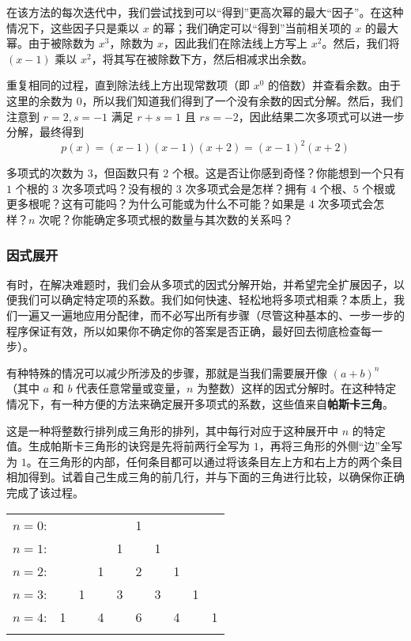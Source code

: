 在该方法的每次迭代中，我们尝试找到可以``得到''更高次幂的最大``因子''。在这种情况下，这些因子只是乘以 $x$ 的幂；我们确定可以``得到''当前相关项的 $x$ 的最大幂。由于被除数为 $x^3$，除数为 $x$，因此我们在除法线上方写上 $x^2$。然后，我们将 $(x-1)$ 乘以 $x^2$，将其写在被除数下方，然后相减求出余数。

重复相同的过程，直到除法线上方出现常数项（即 $x^0$ 的倍数）并查看余数。由于这里的余数为 $0$，所以我们知道我们得到了一个没有余数的因式分解。然后，我们注意到 $r=2, s=-1$ 满足 $r+s=1$ 且 $rs=-2$，因此结果二次多项式可以进一步分解，最终得到
\[p(x) = (x - 1)(x - 1)(x + 2) = (x - 1)^2(x + 2)\]

多项式的次数为 $3$，但函数只有 $2$ 个根。这是否让你感到奇怪？你能想到一个只有 $1$ 个根的 $3$ 次多项式吗？没有根的 $3$ 次多项式会是怎样？拥有 $4$ 个根、$5$ 个根或更多根呢？这有可能吗？为什么可能或为什么不可能？如果是 $4$ 次多项式会怎样？$n$ 次呢？你能确定多项式根的数量与其次数的关系吗？

\subsubsection*{因式展开}

有时，在解决难题时，我们会从多项式的因式分解开始，并希望完全扩展因子，以便我们可以确定特定项的系数。我们如何快速、轻松地将多项式相乘？本质上，我们一遍又一遍地应用分配律，而不必写出所有步骤（尽管这种基本的、一步一步的程序保证有效，所以如果你不确定你的答案是否正确，最好回去彻底检查每一步）。

有种特殊的情况可以减少所涉及的步骤，那就是当我们需要展开像 $(a+b)^n$ （其中 $a$ 和 $b$ 代表任意常量或变量，$n$ 为整数）这样的因式分解时。在这种特定情况下，有一种方便的方法来确定展开多项式的系数，这些值来自\textbf{帕斯卡三角}。

这是一种将整数行排列成三角形的排列，其中每行对应于这种展开中 $n$ 的特定值。生成帕斯卡三角形的诀窍是先将前两行全写为 $1$，再将三角形的外侧``边''全写为 $1$。在三角形的内部，任何条目都可以通过将该条目左上方和右上方的两个条目相加得到。试着自己生成三角的前几行，并与下面的三角进行比较，以确保你正确完成了该过程。

\begin{center}
    \begin{tabular}{rccccccccc}
        $n=0$: &    &    &    &    &  1\\\noalign{\smallskip\smallskip}
        $n=1$: &    &    &    &  1 &    &  1\\\noalign{\smallskip\smallskip}
        $n=2$: &    &    &  1 &    &  2 &    &  1\\\noalign{\smallskip\smallskip}
        $n=3$: &    &  1 &    &  3 &    &  3 &    &  1\\\noalign{\smallskip\smallskip}
        $n=4$: &  1 &    &  4 &    &  6 &    &  4 &    &  1\\\noalign{\smallskip\smallskip}
    \end{tabular}
\end{center}

